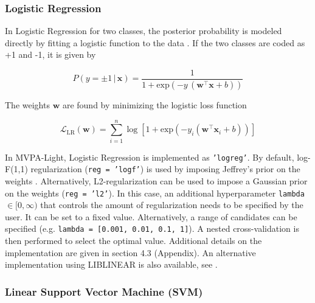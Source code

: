 \documentclass[utf8]{frontiersSCNS} %
\newcommand{\w}{\mathbf{w}}
\newcommand{\x}{\mathbf{x}}
\renewcommand{\L}{\mathcal{L}}
\newcommand{\ttt}[1]{\texttt{#1}}
\begin{document}
\subsubsection{Logistic Regression}

In Logistic Regression for two classes, the posterior probability is modeled directly by fitting a logistic function to the data \citep{Hastie2009}. If the two classes are coded as +1 and -1, it is given by

\begin{equation}
\label{eq:logreg_probability}
P(y = \pm 1\,|\,\x) = \frac{1}{1 + \text{exp}(-y\,(\w^\top\x + b))}
\end{equation}

The weights $\w$ are found by minimizing the logistic loss function

\begin{equation}
\label{eq:logreg_loss_function}
\L_\text{LR}(\w) = \sum_{i=1}^n \log[1 + \text{exp}(-y_i(\w^\top\x_i + b))]
\end{equation}

In MVPA-Light, Logistic Regression  is implemented as \texttt{'logreg'}. By default, log-F(1,1) regularization (\ttt{reg = 'logf'}) is used by imposing Jeffrey's prior on the weights \citep{Firth1993BiasEstimates,Rahman2017PerformanceData.,King2001}. Alternatively, L2-regularization can be used to impose a Gaussian prior on the weights (\ttt{reg = 'l2'}). In this case, an additional hyperparameter \ttt{lambda} $\in [0,\infty)$ that controls the amount of regularization needs to be specified by the user. It can be set to a fixed value. Alternatively, a range of candidates can be specified (e.g. \ttt{lambda = [0.001, 0.01, 0.1, 1]}). A nested cross-validation is then performed to select the optimal value. Additional details on the implementation are given in section 4.3 (Appendix). An alternative implementation using LIBLINEAR is also available, see .

\subsubsection{Linear Support Vector Machine (SVM)}
\end{document}
